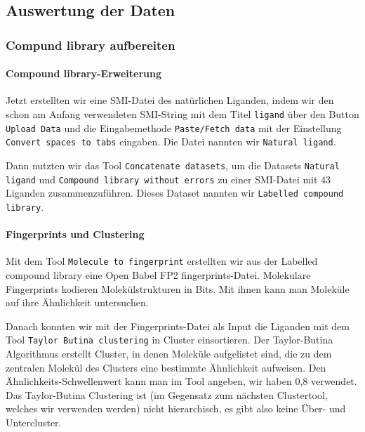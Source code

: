 \documentclass[10pt]{article}
\begin{document}
    \subsection{Auswertung der Daten}\label{subsubsec:aufbereitung-der-daten}

    \subsubsection{Compund library aufbereiten}

    \paragraph{Compound library-Erweiterung}
    Jetzt erstellten wir eine SMI-Datei des natürlichen Liganden, indem wir den schon am Anfang verwendeten
    SMI-String mit dem Titel \texttt{ligand} über den Button \texttt{Upload Data} und die Eingabemethode
    \texttt{Paste/Fetch data} mit der
    Einstellung \texttt{Convert spaces to tabs} eingaben. Die Datei nannten wir \texttt{Natural ligand}.

    Dann nutzten wir das Tool \texttt{Concatenate datasets}, um die Datasets \texttt{Natural ligand} und
    \texttt{Compound library without
    errors} zu einer SMI-Datei mit 43 Liganden zusammenzuführen. Dieses Dataset nannten wir \texttt{Labelled compound
    library}.

    \paragraph{Fingerprints und Clustering}
    Mit dem Tool \texttt{Molecule to fingerprint} erstellten wir aus der Labelled compound library eine Open Babel FP2
    fingerprints-Datei.\cite{8, 18} Molekulare Fingerprints kodieren Molekülstrukturen in Bits. Mit ihnen
    kann man Moleküle auf
    ihre Ähnlichkeit untersuchen.

    Danach konnten wir mit der Fingerprints-Datei als Input die Liganden mit dem Tool \texttt{Taylor Butina
    clustering} in
    Cluster einsortieren.\cite{6} Der Taylor-Butina Algorithmus erstellt Cluster, in denen Moleküle aufgelistet
    sind, die zu
    dem zentralen Molekül des Clusters eine bestimmte Ähnlichkeit aufweisen. Den Ähnlichkeits-Schwellenwert kann man
    im Tool angeben, wir haben 0,8 verwendet. Das Taylor-Butina Clustering ist (im Gegensatz zum nächsten
    Clustertool, welches wir verwenden werden) nicht hierarchisch, es gibt also keine Über- und Untercluster.
\end{document}
